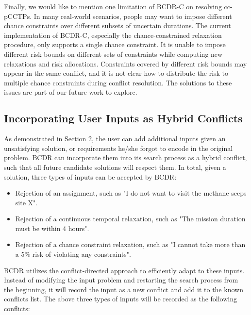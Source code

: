 \documentclass[jair,twoside,11pt,theapa]{article}
\begin{document}
Finally, we would like to mention one limitation of BCDR-C on resolving
cc-pCCTPs. In many real-world scenarios, people may want to impose different chance
constraints over different subsets of uncertain durations. The current
implementation of BCDR-C, especially the chance-constrained relaxation
procedure, only supports a single chance constraint. It is unable to impose
different risk bounds on different sets of constraints while computing new
relaxations and risk allocations. Constraints covered by different risk bounds
may appear in the same conflict, and it is not clear how to distribute the risk
to multiple chance constraints during conflict resolution. The solutions to
these issues are part of our future work to explore.


\subsection{Incorporating User Inputs as Hybrid Conflicts}  


As demonstrated in Section 2, the user can add additional inputs given an
unsatisfying solution, or requirements he/she forgot to encode in the original
problem. BCDR can incorporate them into its search process as a hybrid conflict,
such that all future candidate solutions will respect them. In total, given a
solution, three types of inputs can be accepted by BCDR:

\begin{itemize}
	
	
	\item Rejection of an assignment, such as "I do not want to visit the methane seeps
	site X".
	
	
	\item Rejection of a continuous temporal relaxation, such as "The mission duration must be
	within 4 hours".
	
	
	\item Rejection of a chance constraint relaxation, such as "I cannot take more
	than a 5\% risk of violating any constraints".
	
\end{itemize}


BCDR utilizes the conflict-directed approach to efficiently adapt to these
inputs. Instead of modifying the input problem and restarting the search process from
the beginning, it will record the input as a new conflict and add it to the
known conflicts list. The above three types of inputs will be recorded as the
following conflicts:
\end{document}
